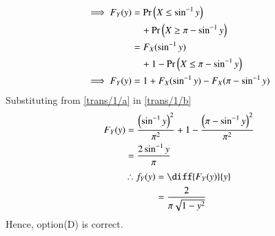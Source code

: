 \begin{align}
    \implies F_Y(y) &= \Pr\left(X\leq \sin^{-1}{y}\right) \nonumber \\
    & \quad +\Pr\left(X\geq \pi-\sin^{-1}{y}\right)\\
     &= F_X(\sin^{-1}{y}) \nonumber \\
     & \quad +1-\Pr\left(X\leq \pi-\sin^{-1}{y}\right)\\
    \implies F_Y(y) &= 1 + F_X(\sin^{-1}{y})-F_X(\pi-\sin^{-1}{y})
    \label{trans/1/b}
\end{align}
Substituting from  \eqref{trans/1/a} in \eqref{trans/1/b}
\begin{align}
 F_Y(y) &= \frac{\left(\sin^{-1}{y}\right)^2}{\pi^2}+1-\frac{\left(\pi-\sin^{-1}{y}\right)^2}{\pi^2}\\
    &= \frac{2\sin^{-1}{y}}{\pi}
\end{align}
%
\begin{align}
    \therefore     f_Y(y) &= \diff{F_Y(y)}{y}\\
    &= \frac{2}{\pi\sqrt{1-y^2}}
\end{align}
Hence, option(D) is correct.
